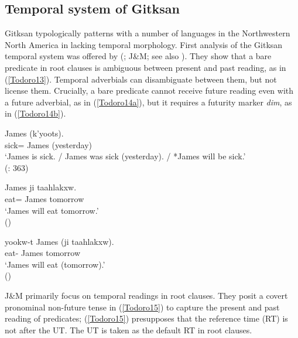 \documentclass[output=paper]{langscibook}
\begin{document}
\subsection{Temporal system of Gitksan}

Gitksan typologically patterns with a number of languages in the Northwestern North America in lacking temporal morphology. First analysis of the Gitksan temporal system was offered by \citeauthor{johannsdottirmatthewson2007a} (\citeyear{johannsdottirmatthewson2007a}; J\&M; see also \citealt{matthewson2013a}). They show that a bare predicate in root clauses is ambiguous between present and past reading, as in (\ref{Todoro13}). Temporal adverbials can disambiguate between them, but not license them. Crucially, a bare predicate cannot receive future reading even with a future adverbial, as in (\ref{Todoro14a}), but it requires a futurity marker \emph{dim}, as in (\ref{Todoro14b}). 

\begin{exe}
\ex \label{Todoro13}
 {James} {(k'yoots).} \\
    sick={\pn} James (yesterday)\\
\glt `James is sick. / James was sick (yesterday). / *James will be sick.' \\ (\citealt{matthewson2013a}: 363)
\end{exe}

\begin{exe}
\ex \label{Todoro14}
\begin{xlist}

\ex \label{Todoro14a}
 {James} {ji} {taahlakxw}. \\
    eat={\cn} James  tomorrow\\
\glt `James will eat tomorrow.' \\(\citealt{johannsdottirmatthewson2007a})

\ex \label{Todoro14b}
 {yookw-t} {James} ({ji} {taahlakxw}). \\
     eat-{\cn} James  tomorrow\\
\glt `James will eat (tomorrow).'  \\(\citealt{johannsdottirmatthewson2007a}) 

\end{xlist}
\end{exe}


J\&M primarily focus on temporal readings in root clauses. They posit a covert pronominal non-future tense in (\ref{Todoro15}) to capture the present and past reading of predicates; (\ref{Todoro15}) presupposes that the reference time (RT) is not after the UT. The UT is taken as the default RT in root clauses. 
\end{document}
